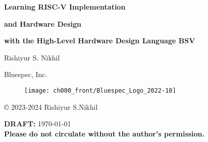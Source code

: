 
\pagestyle{empty}

\begin{center}

\vspace*{1.5in}

{\LARGE\bf Learning RISC-V Implementation}

{\LARGE\bf and Hardware Design}

{\LARGE\bf with the High-Level Hardware Design Language BSV}

\vspace{2cm}

{\Large Rishiyur S. Nikhil}

Bluespec, Inc.

\vspace*{0.5in}

\begin{figure}[htbp]
  \centerline{\texttt{[image: ch000\_front/Bluespec\_Logo\_2022-10]}}
\end{figure}

\vfill

\copyright{} 2023-2024 Rishiyur S.Nikhil

\vspace{0.5in}

{\bf DRAFT:} \today \\
{\bf Please do not circulate without the author's permission.}

\end{center}


% 



\vspace*{2in}


% 


\newpage

\pagestyle{myheadings}


{\small

\tableofcontents

}




